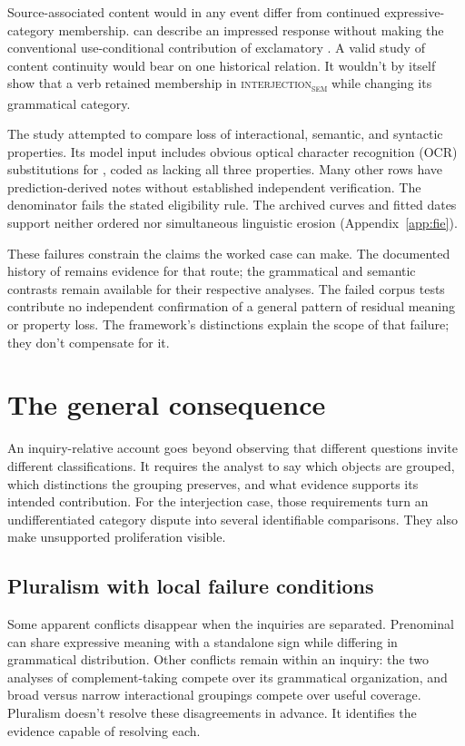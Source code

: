 \documentclass[12pt]{article}
\newcommand{\intj}[1]{\textsc{interjection\textsubscript{#1}}}
\begin{document}
Source-associated content would in any event differ from continued
expressive-category membership. 
can describe an impressed response without making the conventional
use-conditional contribution of exclamatory . A valid
study of content continuity would bear on one historical relation.
It wouldn't by itself show that a verb retained membership in
\intj{sem} while changing its grammatical category.

The  study attempted to compare loss of interactional,
semantic, and syntactic properties. Its model input includes obvious
optical character recognition (OCR) substitutions for , coded as lacking all three
properties. Many other rows have prediction-derived notes without
established independent verification. The denominator
fails the stated eligibility rule. The archived curves and fitted
dates support neither ordered nor simultaneous linguistic erosion
(Appendix~\ref{app:fie}).

These failures constrain the claims the worked case can make.
The documented history of  remains evidence for that
route; the grammatical and semantic contrasts remain available
for their respective analyses. The failed corpus tests contribute
no independent confirmation of a general pattern of residual
meaning or property loss. The framework's distinctions explain
the scope of that failure; they don't compensate for it.

\section{The general consequence}\label{sec:discussion}

An inquiry-relative account goes beyond observing that different
questions invite different classifications. It requires the analyst
to say which objects are grouped, which distinctions the grouping
preserves, and what evidence supports its intended contribution.
For the interjection case, those requirements turn an undifferentiated
category dispute into several identifiable comparisons. They also
make unsupported proliferation visible.

\subsection{Pluralism with local failure conditions}

Some apparent conflicts disappear when the inquiries are separated.
Prenominal  can share expressive meaning with a
standalone sign while differing in grammatical distribution. Other
conflicts remain within an inquiry: the two analyses of complement-taking
 compete over its grammatical organization, and broad
versus narrow interactional groupings compete over useful coverage.
Pluralism doesn't resolve these disagreements in advance. It
identifies the evidence capable of resolving each.
\end{document}
